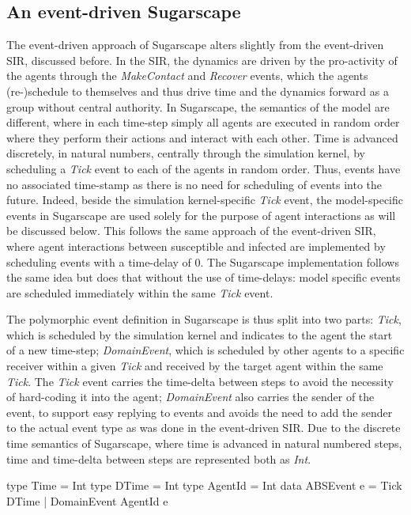 \subsection{An event-driven Sugarscape}
The event-driven approach of Sugarscape alters slightly from the event-driven SIR, discussed before. In the SIR, the dynamics are driven by the pro-activity of the agents through the \textit{MakeContact} and \textit{Recover} events, which the agents (re-)schedule to themselves and thus drive time and the dynamics forward as a group without central authority. In Sugarscape, the semantics of the model are different, where in each time-step simply all agents are executed in random order where they perform their actions and interact with each other. Time is advanced discretely, in natural numbers, centrally through the simulation kernel, by scheduling a \textit{Tick} event to each of the agents in random order. Thus, events have no associated time-stamp as there is no need for scheduling of events into the future. Indeed, beside the simulation kernel-specific \textit{Tick} event, the model-specific events in Sugarscape are used solely for the purpose of agent interactions as will be discussed below. This follows the same approach of the event-driven SIR, where agent interactions between susceptible and infected are implemented by scheduling events with a time-delay of 0. The Sugarscape implementation follows the same idea but does that without the use of time-delays: model specific events are scheduled immediately within the same \textit{Tick} event.

The polymorphic event definition in Sugarscape is thus split into two parts: \textit{Tick}, which is scheduled by the simulation kernel and indicates to the agent the start of a new time-step; \textit{DomainEvent}, which is scheduled by other agents to a specific receiver within a given \textit{Tick} and received by the target agent within the same \textit{Tick}. The \textit{Tick} event carries the time-delta between steps to avoid the necessity of hard-coding it into the agent; \textit{DomainEvent} also carries the sender of the event, to support easy replying to events and avoids the need to add the sender to the actual event type as was done in the event-driven SIR. Due to the discrete time semantics of Sugarscape, where time is advanced in natural numbered steps, time and time-delta between steps are represented both as \textit{Int}.

\begin{HaskellCode}
type Time       = Int
type DTime      = Int
type AgentId    = Int
data ABSEvent e = Tick DTime 
                | DomainEvent AgentId e
\end{HaskellCode}

